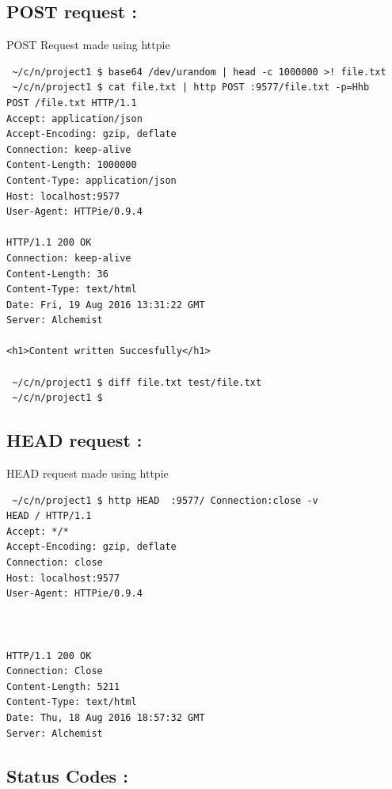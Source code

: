 \documentclass[11pt]{article}
\begin{document}
\newpage
\subsection{POST request :}
\label{sec:orgheadline16}
\label{orgtarget3}
\noindent POST Request made using httpie 

\begin{verbatim}
 ~/c/n/project1 $ base64 /dev/urandom | head -c 1000000 >! file.txt
 ~/c/n/project1 $ cat file.txt | http POST :9577/file.txt -p=Hhb
POST /file.txt HTTP/1.1
Accept: application/json
Accept-Encoding: gzip, deflate
Connection: keep-alive
Content-Length: 1000000
Content-Type: application/json
Host: localhost:9577
User-Agent: HTTPie/0.9.4

HTTP/1.1 200 OK
Connection: keep-alive 
Content-Length: 36
Content-Type: text/html
Date: Fri, 19 Aug 2016 13:31:22 GMT
Server: Alchemist

<h1>Content written Succesfully</h1>

 ~/c/n/project1 $ diff file.txt test/file.txt
 ~/c/n/project1 $
\end{verbatim}

\subsection{HEAD request :}
\label{sec:orgheadline19}
\label{orgtarget4}
HEAD request made using httpie
\begin{verbatim}
 ~/c/n/project1 $ http HEAD  :9577/ Connection:close -v
HEAD / HTTP/1.1
Accept: */*
Accept-Encoding: gzip, deflate
Connection: close
Host: localhost:9577
User-Agent: HTTPie/0.9.4



HTTP/1.1 200 OK
Connection: Close
Content-Length: 5211
Content-Type: text/html
Date: Thu, 18 Aug 2016 18:57:32 GMT
Server: Alchemist
\end{verbatim}

\newpage
\subsection{Status Codes :}
\label{sec:orgheadline22}
\end{document}
